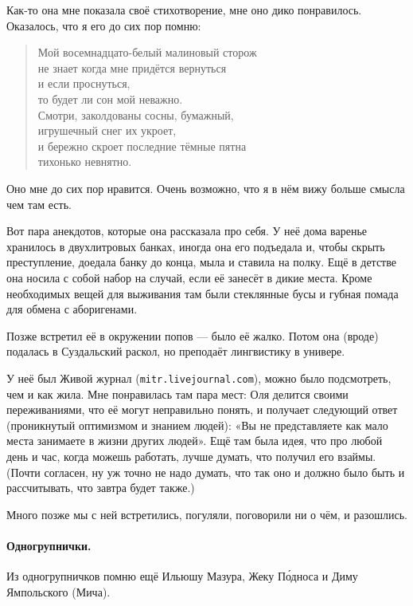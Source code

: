 \documentclass{book}
\begin{document}
Как-то она мне показала своё стихотворение, мне оно дико понравилось.
Оказалось, что я его до сих пор помню:
\begin{verse}
Мой восемнадцато-белый малиновый сторож
\\
\qquad не знает когда мне придётся вернуться
\\
\qquad\qquad  и если проснуться,
\\
\qquad\qquad\qquad то будет ли сон мой неважно.
\\
Смотри, заколдованы сосны, бумажный,
\\
\qquad игрушечный снег их укроет,
\\
\qquad\qquad и бережно скроет последние тёмные пятна
\\
\qquad\qquad\qquad тихонько невнятно.
\end{verse}
Оно мне до сих пор нравится.
Очень возможно, что я в нём вижу больше смысла чем там есть.

Вот пара анекдотов, которые она рассказала про себя.
У неё дома варенье хранилось в двухлитровых банках,
иногда она его подъедала и, чтобы скрыть преступление, доедала банку до конца, мыла и ставила на полку.
Ещё в детстве она носила с собой набор на случай, если её занесёт в дикие места.
Кроме необходимых вещей для выживания там были стеклянные бусы и губная помада для обмена с аборигенами. 

Позже встретил её в окружении попов --- было её жалко.
Потом она (вроде) подалась в Суздальский раскол, но преподаёт лингвистику в универе.

У неё был Живой журнал (\texttt{mitr.livejournal.com}), можно было подсмотреть, чем и как жила.
Мне понравилась там пара мест:
Оля делится своими переживаниями, что её могут неправильно понять, и получает следующий ответ (проникнутый оптимизмом и знанием людей): «Вы не представляете как мало места занимаете в жизни других людей».
Ещё там была идея, что про любой день и час, когда можешь работать, лучше думать, что получил его взаймы.
(Почти согласен, ну уж точно не надо думать, что так оно и должно было быть и рассчитывать, что завтра будет также.)

Много позже мы с ней встретились, погуляли, поговорили ни о чём, и разошлись.

\paragraph{Одногрупнички.}
Из одногрупничков помню ещё Ильюшу Мазура,
Жеку П\'{о}дноса и Диму Ямпольского (Мича).
\end{document}
